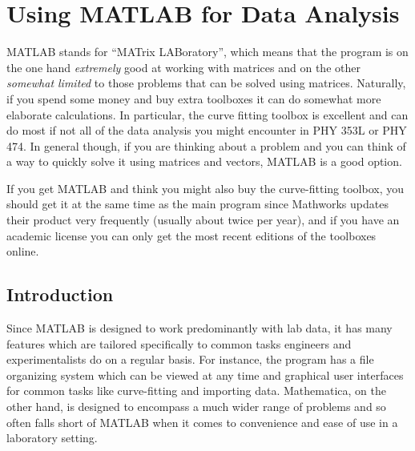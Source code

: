

\chapter{Using MATLAB for Data Analysis}
MATLAB stands for ``MATrix LABoratory'', which means that the program is on the one hand {\it extremely} good at working with matrices and on the other {\it somewhat limited} to those problems that can be solved using matrices. Naturally, if you spend some money and buy extra toolboxes it can do somewhat more elaborate calculations. In particular, the curve fitting toolbox is excellent and can do most if not all of the data analysis you might encounter in PHY 353L or PHY 474. In general though, if you are thinking about a problem and you can think of a way to quickly solve it using matrices and vectors, MATLAB is a good option. 

\begin{remark}
If you get MATLAB and think you might also buy the curve-fitting toolbox, you should get it at the same time as the main program since Mathworks updates their product very frequently (usually about twice per year), and if you have an academic license you can only get the most recent editions of the toolboxes online.
\end{remark}
\section{Introduction}
Since MATLAB is designed to work predominantly with lab data, it has many features which are tailored specifically to common tasks engineers and experimentalists do on a regular basis. For instance, the program has a file organizing system which can be viewed at any time and graphical user interfaces for common tasks like curve-fitting and importing data. Mathematica, on the other hand, is designed to encompass a much wider range of problems and so often falls short of MATLAB when it comes to convenience and ease of use in a laboratory setting.
